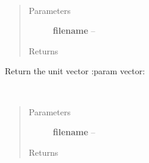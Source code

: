 \documentclass[letterpaper,10pt,english]{sphinxmanual}
\begin{document}

\begin{fulllineitems}
\label{index:aietes.Tools.unext}~\begin{quote}\begin{description}
\item[{Parameters}] \leavevmode
\textbf{filename} -- 

\item[{Returns}] \leavevmode


\end{description}\end{quote}

\end{fulllineitems}


\begin{fulllineitems}
\label{index:aietes.Tools.unit}
Return the unit vector
:param vector:

\end{fulllineitems}


\begin{fulllineitems}
\label{index:aietes.Tools.unpickle}~\begin{quote}\begin{description}
\item[{Parameters}] \leavevmode
\textbf{filename} -- 

\item[{Returns}] \leavevmode


\end{description}\end{quote}

\end{fulllineitems}

\end{document}

